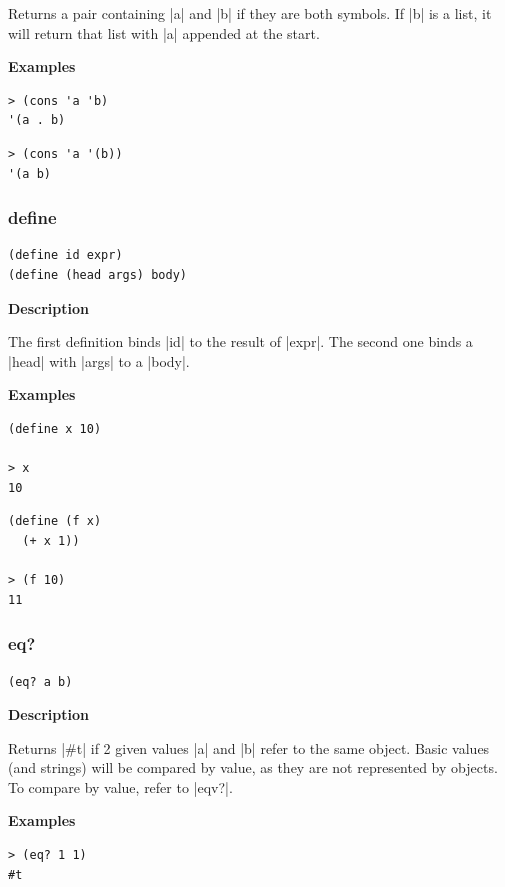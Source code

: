 \documentclass[a4paper]{article}
\begin{document}
Returns a pair containing |a| and |b| if they are both symbols. If |b| is a list, it will return that list with |a| appended at the start.

\textbf{Examples}

\begin{lstlisting}
> (cons 'a 'b)
'(a . b)
\end{lstlisting}

\begin{lstlisting}
> (cons 'a '(b))
'(a b)
\end{lstlisting}

\subsubsection{define}

\begin{lstlisting}[frame=none]
(define id expr)
(define (head args) body)
\end{lstlisting}

\textbf{Description}

The first definition binds |id| to the result of |expr|. The second one binds a |head| with |args| to a |body|.

\textbf{Examples}

\begin{lstlisting}
(define x 10)

> x
10
\end{lstlisting}

\begin{lstlisting}
(define (f x)
  (+ x 1))
  
> (f 10)
11
\end{lstlisting}


\subsubsection{eq?}

\begin{lstlisting}[frame=none]
(eq? a b)
\end{lstlisting}

\textbf{Description}

Returns |#t| if 2 given values |a| and |b| refer to the same object. Basic values (and strings) will be compared by value, as they are not represented by objects. To compare by value, refer to |eqv?|.

\textbf{Examples}

\begin{lstlisting}
> (eq? 1 1)
#t
\end{lstlisting}
\end{document}
